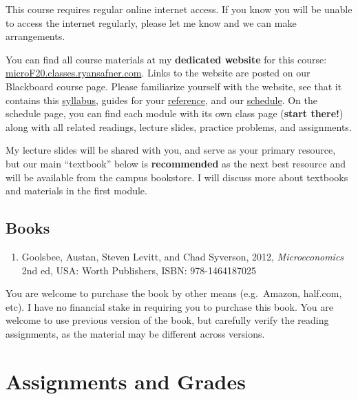 \documentclass{article}
\providecommand{\tightlist}{%
  \setlength{\itemsep}{0pt}\setlength{\parskip}{0pt}}
\begin{document}
This course requires regular online internet access. If you know you
will be unable to access the internet regularly, please let me know and
we can make arrangements.

You can find all course materials at my \textbf{dedicated website} for
this course:
\href{https://microF20.classes.ryansafner.com}{microF20.classes.ryansafner.com}.
Links to the website are posted on our Blackboard course page. Please
familiarize yourself with the website, see that it contains this
\href{https://microF20.classes.ryansafner.com/syllabus/}{syllabus},
guides for your
\href{https://microF20.classes.ryansafner.com/reference/}{reference},
and our
\href{https://microF20.classes.ryansafner.com/schedule/}{schedule}. On
the schedule page, you can find each module with its own class page
(\textbf{start there!}) along with all related readings, lecture slides,
practice problems, and assignments.

My lecture slides will be shared with you, and serve as your primary
resource, but our main ``textbook'' below is \textbf{recommended} as the
next best resource and will be available from the campus bookstore. I
will discuss more about textbooks and materials in the first module.

\hypertarget{books}{%
\subsection*{Books}\label{books}}

\begin{enumerate}
\def\labelenumi{\arabic{enumi}.}
\tightlist
\item
  Goolsbee, Austan, Steven Levitt, and Chad Syverson, 2012,
  \emph{Microeconomics} 2nd ed, USA: Worth Publishers, ISBN:
  978-1464187025
\end{enumerate}

You are welcome to purchase the book by other means (e.g.~Amazon,
half.com, etc). I have no financial stake in requiring you to purchase
this book. You are welcome to use previous version of the book, but
carefully verify the reading assignments, as the material may be
different across versions.

\hypertarget{assignments-and-grades}{%
\section*{Assignments and Grades}\label{assignments-and-grades}}
\end{document}

